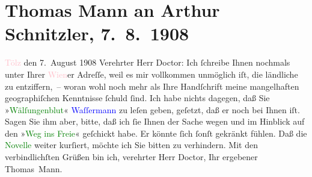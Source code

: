 

               \section[Thomas Mann an Arthur Schnitzler, 7. 8. 1908]{ Thomas Mann an Arthur Schnitzler, 7. 8. 1908}\nopagebreak{}\rehead{ }\normalsize\beginnumbering{} \toendnotes[C]{\smallbreak\pagebreak[2]} 
\toendnotes[C]{\smallbreak}\pstart
           {\pb}\textcolor{pink}{Tölz}{}\ledrightnote{\textcolor{pink}{Bad Tölz}} den 7. August 1908\pend
           \pstart{}Verehrter Herr Doctor:\pend\pstart
           Ich ſchreibe Ihnen nochmals unter Ihrer \textcolor{pink}{Wien}{}\ledrightnote{\textcolor{pink}{Wien}}er
                    Adreſſe, weil es mir vollkommen unmöglich iſt, die ländliche zu entziffern, –
                    woran wohl noch mehr als Ihre Handſchrift meine mangelhaften geographiſchen
                    Kenntnisse ſchuld ſind.\pend
           \pstart
           Ich habe nichts dagegen, daß Sie {\pb}»\textcolor{green}{Wälſungenblut}{}\ledrightnote{\textcolor{green}{Wälsungenblut}}« \textcolor{blue}{Waſſermann}{}\ledrightnote{\textcolor{blue}{Jakob Wassermann}} zu leſen geben, geſetzt, daß er noch bei Ihnen iſt. Sagen
                    Sie ihm aber, bitte, daß ich ſie Ihnen der Sache wegen und im Hinblick auf den
                        »\textcolor{green}{Weg ins Freie}{}\ledrightnote{\textcolor{green}{Der Weg ins Freie. Roman}}« geſchickt habe. Er könnte
                    ſich ſonſt gekränkt fühlen. Daß die \textcolor{green}{Novelle}{} weiter kurſiert, möchte ich Sie bitten zu
                    verhindern.\pend
           \pstart
           Mit den verbindlichſten Grüßen bin ich, verehrter Herr Doctor, Ihr ergebener\pend
           \pstart \spacefill\mbox{Thomas Mann.}\pend{}\endnumbering{}  
      